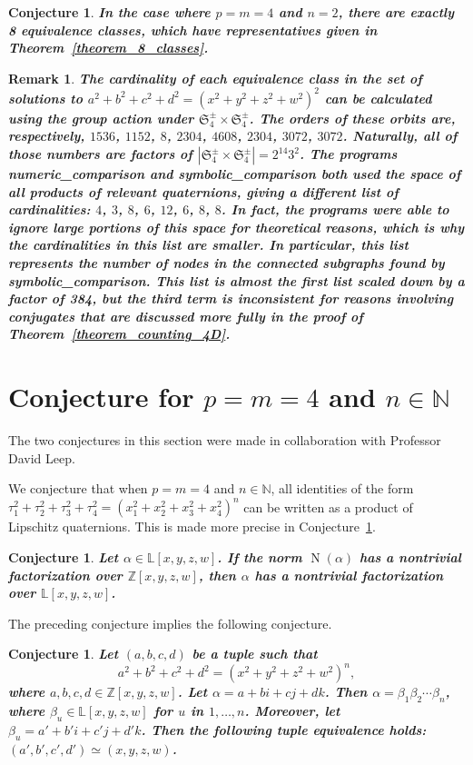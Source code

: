 \documentclass[12pt,table]{article}
\newtheorem{remark}[theorem]{Remark}
\newtheorem{conjecture}[theorem]{Conjecture}
\numberwithin{equation}{section}
\DeclareMathOperator{\N}{N}
\newcommand{\Nnn}{\mathbb N}
\newcommand{\Zzz}{\mathbb Z}
\newcommand{\Lll}{\mathbb L}
\begin{document}
\begin{landscape}
{{\begin{conjecture}
\bf
In the case where  $p = m = 4$ and $n = 2$,
there are exactly 8 equivalence classes, which have representatives
given in Theorem~\ref{theorem_8_classes}.
\end{conjecture}

\begin{remark}
\bf
The cardinality of each equivalence class in the
set of solutions to $a^2 + b^2 + c^2 + d^2 = (x^2 + y^2 + z^2 + w^2)^2$
can be calculated using the group action under
$ \mathfrak{S}_4^\pm \times \mathfrak{S}_4^\pm $.
The orders of these orbits are, respectively,
$1536$, $1152$, $8$, $2304$, $4608$, $2304$, $3072$, $3072$.
Naturally, all of those numbers are factors of
$ | \mathfrak{S}_4^\pm \times \mathfrak{S}_4^\pm | = 2^{14} 3^2 $.
The programs \emph{numeric\_comparison} and \emph{symbolic\_comparison} 
both used the space of all products of relevant quaternions,
giving a different list of cardinalities:
$4$, $3$, $8$, $6$, $12$, $6$, $8$, $8$.
In fact, the programs were able to ignore large
portions of this space for theoretical reasons,
which is why the cardinalities in this list are
smaller.
In particular, this list represents the number of
nodes in the connected subgraphs found by  \emph{symbolic\_comparison}.
This list is almost the first list
scaled down by a factor of 384, but the third term is inconsistent
for reasons involving conjugates that are discussed more fully in
the proof of Theorem~\ref{theorem_counting_4D}.
\end{remark}

\section{Conjecture for $p = m = 4$ and $ n \in \Nnn $}
The two conjectures in this section were made in collaboration with
Professor David Leep.

We conjecture that when $p = m = 4$ and $ n \in \Nnn $,
all identities of the form
$
\tau_1 ^ 2  + \tau_2 ^ 2  + \tau_3 ^ 2  + \tau_4 ^ 2  
= 
\left(  x_1 ^ 2 + x_2 ^ 2 + x_3 ^ 2 + x_4 ^ 2
\right) ^ n 
$
can be written as
a product of Lipschitz quaternions.
This is made more precise in
Conjecture~\ref{conjecture_Ehrenborg-Leep}.

\begin{conjecture}
\bf
Let $ \alpha \in \Lll[x,y,z,w] $.
If the norm $ \N(\alpha) $ has a nontrivial
factorization over $ \Zzz[x,y,z,w] $,
then $ \alpha $ has a nontrivial
factorization over $ \Lll[x,y,z,w] $.
\end{conjecture}
The preceding conjecture implies the following conjecture.
\begin{conjecture}
\label{conjecture_Ehrenborg-Leep}
\bf
Let $ (a, b, c, d) $ be a tuple such that
\[
a^2 + b^2 + c^2 + d^2 = (x^2 + y^2 + z^2 + w^2)^n,
\] 
where $ a, b, c, d \in \Zzz[x,y,z,w]$.
Let $\alpha = a + bi + cj + dk $.
Then $ \alpha = \beta_1 \beta_2 \dotsm \beta_n $,
where $ \beta_u \in \Lll[x,y,z,w] $ for $u$ in $1, \dotsc, n$.
Moreover, let $ \beta_u = a' + b'i + c'j + d'k $. Then
the following tuple equivalence holds: $ (a', b', c', d') \simeq (x, y, z, w) $.
\end{conjecture}



}}
\end{landscape}
\end{document}
